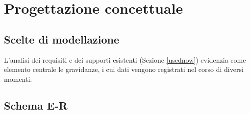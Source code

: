\chapter{Progettazione concettuale}

\section{Scelte di modellazione}

L'analisi dei requisiti e dei supporti esistenti (Sezione \ref{usednow}) evidenzia come elemento centrale le gravidanze, i cui dati vengono registrati nel corso di diversi momenti.

\section{Schema E-R}